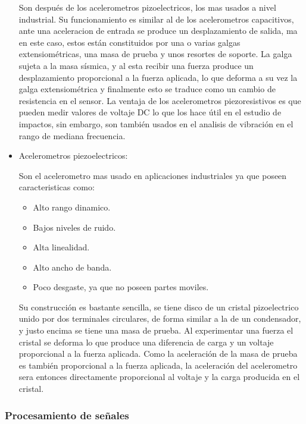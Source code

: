 \begin{itemize}
        Son después de los acelerometros pizoelectricos, los mas usados a nivel
        industrial. Su funcionamiento es similar al de los acelerometros
        capacitivos, ante una aceleracion de entrada se produce un desplazamiento
        de salida, ma en este caso, estos están constituidos por una o varias
        galgas extensiométricas, una masa de prueba y unos resortes de soporte.
        La galga sujeta a la masa sísmica, y al esta recibir una fuerza produce
        un desplazamiento proporcional a la fuerza aplicada, lo que deforma a
        su vez la galga extensiométrica y finalmente esto se traduce como un
        cambio de resistencia en el sensor. La ventaja de los acelerometros
        piezoresistivos es que pueden medir valores de voltaje DC lo que los
        hace útil en el estudio de impactos, sin embargo, son también usados en el
        analisis de vibración en el rango de mediana frecuencia.


    \item Acelerometros piezoelectricos:

        Son el acelerometro mas usado en aplicaciones industriales ya que
        poseen caracteristicas como:

        \begin{itemize}
            \item Alto rango dinamico.
            \item Bajos niveles de ruido.
            \item Alta linealidad.
            \item Alto ancho de banda.
            \item Poco desgaste, ya que no poseen partes moviles.
        \end{itemize}


        Su construcción es bastante sencilla, se tiene disco de un cristal
        pizoelectrico unido por dos terminales circulares, de forma similar a
        la de un condensador, y justo encima se tiene una masa de prueba.
        Al experimentar una fuerza el cristal se deforma lo que produce una
        diferencia de carga y un voltaje proporcional a la fuerza aplicada.
        Como la aceleración de la masa de prueba es también proporcional a la
        fuerza aplicada, la aceleración del acelerometro sera entonces
        directamente proporcional al voltaje y la carga producida en el cristal.

\end{itemize}


\subsubsection{Procesamiento de señales}

